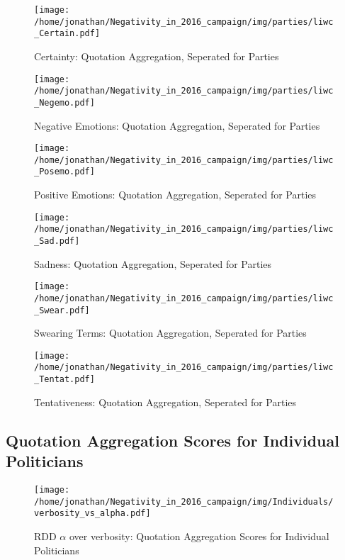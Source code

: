 \begin{figure}[h]\centering
	\texttt{[image: /home/jonathan/Negativity\_in\_2016\_campaign/img/parties/liwc\_Certain.pdf]}
	\caption{Certainty: Quotation Aggregation, Seperated for Parties}
	\label{fig: parties_Certainty}
\end{figure}

\begin{figure}[h]\centering
	\texttt{[image: /home/jonathan/Negativity\_in\_2016\_campaign/img/parties/liwc\_Negemo.pdf]}
	\caption{Negative Emotions: Quotation Aggregation, Seperated for Parties}
	\label{fig: parties_Negative Emotions}
\end{figure}

\begin{figure}[h]\centering
	\texttt{[image: /home/jonathan/Negativity\_in\_2016\_campaign/img/parties/liwc\_Posemo.pdf]}
	\caption{Positive Emotions: Quotation Aggregation, Seperated for Parties}
	\label{fig: parties_Positive Emotions}
\end{figure}

\begin{figure}[h]\centering
	\texttt{[image: /home/jonathan/Negativity\_in\_2016\_campaign/img/parties/liwc\_Sad.pdf]}
	\caption{Sadness: Quotation Aggregation, Seperated for Parties}
	\label{fig: parties_Sadness}
\end{figure}

\begin{figure}[h]\centering
	\texttt{[image: /home/jonathan/Negativity\_in\_2016\_campaign/img/parties/liwc\_Swear.pdf]}
	\caption{Swearing Terms: Quotation Aggregation, Seperated for Parties}
	\label{fig: parties_Swearing Terms}
\end{figure}

\begin{figure}[h]\centering
	\texttt{[image: /home/jonathan/Negativity\_in\_2016\_campaign/img/parties/liwc\_Tentat.pdf]}
	\caption{Tentativeness: Quotation Aggregation, Seperated for Parties}
	\label{fig: parties_Tentativeness}
\end{figure}

\clearpage
\pagebreak

\subsection{Quotation Aggregation Scores for Individual Politicians}

\begin{figure}[h]\centering
	\texttt{[image: /home/jonathan/Negativity\_in\_2016\_campaign/img/Individuals/verbosity\_vs\_alpha.pdf]}
	\caption{RDD $\alpha$ over verbosity: Quotation Aggregation Scores for Individual Politicians}
	\label{fig: individuals_RDD alpha over verbosity}
\end{figure}


